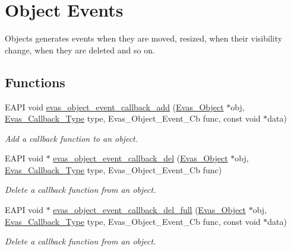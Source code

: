 \section{Object Events}
\label{group__Evas__Object__Group__Events}


Objects generates events when they are moved, resized, when their visibility change, when they are deleted and so on.  


\subsection*{Functions}
\begin{DoxyCompactItemize}
\item 
EAPI void \hyperlink{group__Evas__Object__Group__Events_ga0147a80fc21895dc40165f208ec8cf55}{evas\_\-object\_\-event\_\-callback\_\-add} (\hyperlink{group__Evas__Object__Group_ga9e19e6dd1f517a0ba437c0114d3e7c97}{Evas\_\-Object} $\ast$obj, \hyperlink{Evas_8h_a076b2a9b2de2b2144a4193b1d12ed448}{Evas\_\-Callback\_\-Type} type, Evas\_\-Object\_\-Event\_\-Cb func, const void $\ast$data)
\begin{DoxyCompactList}\small\item\em Add a callback function to an object. \item\end{DoxyCompactList}\item 
EAPI void $\ast$ \hyperlink{group__Evas__Object__Group__Events_ga270a967a4f0069e646e9a07c51e15863}{evas\_\-object\_\-event\_\-callback\_\-del} (\hyperlink{group__Evas__Object__Group_ga9e19e6dd1f517a0ba437c0114d3e7c97}{Evas\_\-Object} $\ast$obj, \hyperlink{Evas_8h_a076b2a9b2de2b2144a4193b1d12ed448}{Evas\_\-Callback\_\-Type} type, Evas\_\-Object\_\-Event\_\-Cb func)
\begin{DoxyCompactList}\small\item\em Delete a callback function from an object. \item\end{DoxyCompactList}\item 
EAPI void $\ast$ \hyperlink{group__Evas__Object__Group__Events_ga5dbed5bfe210ee8f8ffae7b99a69ec68}{evas\_\-object\_\-event\_\-callback\_\-del\_\-full} (\hyperlink{group__Evas__Object__Group_ga9e19e6dd1f517a0ba437c0114d3e7c97}{Evas\_\-Object} $\ast$obj, \hyperlink{Evas_8h_a076b2a9b2de2b2144a4193b1d12ed448}{Evas\_\-Callback\_\-Type} type, Evas\_\-Object\_\-Event\_\-Cb func, const void $\ast$data)
\begin{DoxyCompactList}\small\item\em Delete a callback function from an object. \item\end{DoxyCompactList}\item 

\end{DoxyCompactItemize}
